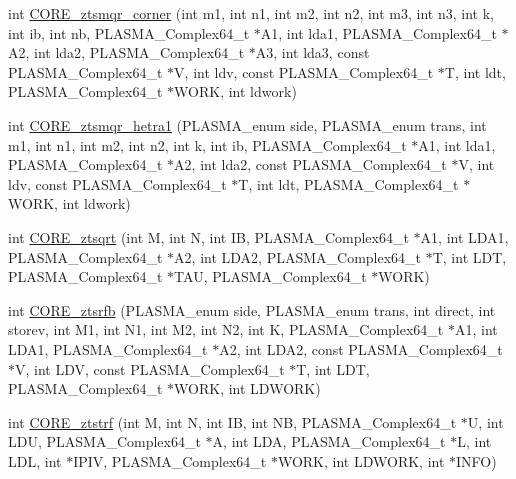 \begin{DoxyCompactItemize}
\item 
int \hyperlink{group__CORE__PLASMA__Complex64__t_gaf6e54c0177d865aed5ec46171cae1652_gaf6e54c0177d865aed5ec46171cae1652}{C\+O\+R\+E\+\_\+ztsmqr\+\_\+corner} (int m1, int n1, int m2, int n2, int m3, int n3, int k, int ib, int nb, P\+L\+A\+S\+M\+A\+\_\+\+Complex64\+\_\+t $\ast$A1, int lda1, P\+L\+A\+S\+M\+A\+\_\+\+Complex64\+\_\+t $\ast$A2, int lda2, P\+L\+A\+S\+M\+A\+\_\+\+Complex64\+\_\+t $\ast$A3, int lda3, const P\+L\+A\+S\+M\+A\+\_\+\+Complex64\+\_\+t $\ast$V, int ldv, const P\+L\+A\+S\+M\+A\+\_\+\+Complex64\+\_\+t $\ast$T, int ldt, P\+L\+A\+S\+M\+A\+\_\+\+Complex64\+\_\+t $\ast$W\+O\+R\+K, int ldwork)
\item 
int \hyperlink{group__CORE__PLASMA__Complex64__t_ga2e82f0ff4ced1424bb320d409f86a861_ga2e82f0ff4ced1424bb320d409f86a861}{C\+O\+R\+E\+\_\+ztsmqr\+\_\+hetra1} (P\+L\+A\+S\+M\+A\+\_\+enum side, P\+L\+A\+S\+M\+A\+\_\+enum trans, int m1, int n1, int m2, int n2, int k, int ib, P\+L\+A\+S\+M\+A\+\_\+\+Complex64\+\_\+t $\ast$A1, int lda1, P\+L\+A\+S\+M\+A\+\_\+\+Complex64\+\_\+t $\ast$A2, int lda2, const P\+L\+A\+S\+M\+A\+\_\+\+Complex64\+\_\+t $\ast$V, int ldv, const P\+L\+A\+S\+M\+A\+\_\+\+Complex64\+\_\+t $\ast$T, int ldt, P\+L\+A\+S\+M\+A\+\_\+\+Complex64\+\_\+t $\ast$W\+O\+R\+K, int ldwork)
\item 
int \hyperlink{group__CORE__PLASMA__Complex64__t_gaf84e5b5b04c91831be8e8270052719ad_gaf84e5b5b04c91831be8e8270052719ad}{C\+O\+R\+E\+\_\+ztsqrt} (int M, int N, int I\+B, P\+L\+A\+S\+M\+A\+\_\+\+Complex64\+\_\+t $\ast$A1, int L\+D\+A1, P\+L\+A\+S\+M\+A\+\_\+\+Complex64\+\_\+t $\ast$A2, int L\+D\+A2, P\+L\+A\+S\+M\+A\+\_\+\+Complex64\+\_\+t $\ast$T, int L\+D\+T, P\+L\+A\+S\+M\+A\+\_\+\+Complex64\+\_\+t $\ast$T\+A\+U, P\+L\+A\+S\+M\+A\+\_\+\+Complex64\+\_\+t $\ast$W\+O\+R\+K)
\item 
int \hyperlink{group__CORE__PLASMA__Complex64__t_gac93a0202d95c4e4b7acc6ff9b09f121d_gac93a0202d95c4e4b7acc6ff9b09f121d}{C\+O\+R\+E\+\_\+ztsrfb} (P\+L\+A\+S\+M\+A\+\_\+enum side, P\+L\+A\+S\+M\+A\+\_\+enum trans, int direct, int storev, int M1, int N1, int M2, int N2, int K, P\+L\+A\+S\+M\+A\+\_\+\+Complex64\+\_\+t $\ast$A1, int L\+D\+A1, P\+L\+A\+S\+M\+A\+\_\+\+Complex64\+\_\+t $\ast$A2, int L\+D\+A2, const P\+L\+A\+S\+M\+A\+\_\+\+Complex64\+\_\+t $\ast$V, int L\+D\+V, const P\+L\+A\+S\+M\+A\+\_\+\+Complex64\+\_\+t $\ast$T, int L\+D\+T, P\+L\+A\+S\+M\+A\+\_\+\+Complex64\+\_\+t $\ast$W\+O\+R\+K, int L\+D\+W\+O\+R\+K)
\item 
int \hyperlink{group__CORE__PLASMA__Complex64__t_ga63eeebb536640f5e7231b34b89f4d8f7_ga63eeebb536640f5e7231b34b89f4d8f7}{C\+O\+R\+E\+\_\+ztstrf} (int M, int N, int I\+B, int N\+B, P\+L\+A\+S\+M\+A\+\_\+\+Complex64\+\_\+t $\ast$U, int L\+D\+U, P\+L\+A\+S\+M\+A\+\_\+\+Complex64\+\_\+t $\ast$A, int L\+D\+A, P\+L\+A\+S\+M\+A\+\_\+\+Complex64\+\_\+t $\ast$L, int L\+D\+L, int $\ast$I\+P\+I\+V, P\+L\+A\+S\+M\+A\+\_\+\+Complex64\+\_\+t $\ast$W\+O\+R\+K, int L\+D\+W\+O\+R\+K, int $\ast$I\+N\+F\+O)

\end{DoxyCompactItemize}
